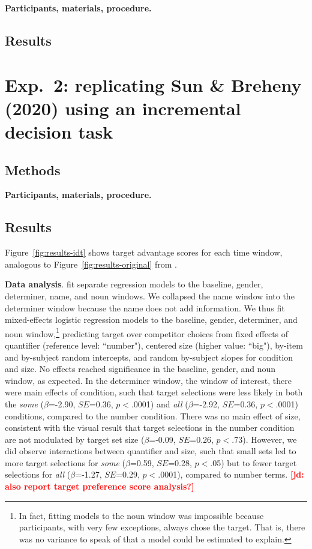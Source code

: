 \documentclass[10pt,letterpaper]{article}
\newcommand{\figref}[1]{Figure~\ref{#1}}
\newcommand{\jd}[1]{\textcolor{Red}{\textbf{[jd: #1]}}}
\begin{document}
\textbf{Participants, materials, procedure.}

\subsection{Results}

\section{Exp.~2: replicating Sun \& Breheny (2020) using an incremental decision task}

\subsection{Methods}

\textbf{Participants, materials, procedure.}

\subsection{Results}

\figref{fig:results-idt} shows target advantage scores for each time window, analogous to \figref{fig:results-original} from .

\textbf{Data analysis}.  fit separate regression models to the baseline, gender, determiner, name, and noun windows. We collapsed the name window into the determiner window because the name does not add information. We thus fit mixed-effects logistic regression models to the baseline, gender, determiner, and noun window,\footnote{In fact, fitting models to the noun window was impossible because participants, with very few exceptions, always chose the target. That is, there was no variance to speak of that a model could be estimated to explain.} predicting target over competitor choices from fixed effects of quantifier (reference level: ``number"), centered size (higher value: ``big"), by-item and by-subject random intercepts, and random by-subject slopes for condition and size. No effects reached significance in the baseline, gender, and noun window, as expected. In the determiner window, the window of interest, there were main effects of condition, such that target selections were less likely in both the \emph{some} ($\beta$=-2.90, $SE$=0.36, $p<$.0001) and \emph{all} ($\beta$=-2.92, $SE$=0.36, $p<$.0001) conditions, compared to the number condition. There was no main effect of size, consistent with the visual result that target selections in the number condition are not modulated by  target set size ($\beta$=-0.09, $SE$=0.26, $p<$.73). However, we did observe interactions between quantifier and size, such that small sets led to more target selections for \emph{some} ($\beta$=0.59, $SE$=0.28, $p<$.05) but to fewer target selections for \emph{all} ($\beta$=-1.27, $SE$=0.29, $p<$.0001), compared to number terms. \jd{also report target preference score analysis?}
\end{document}
